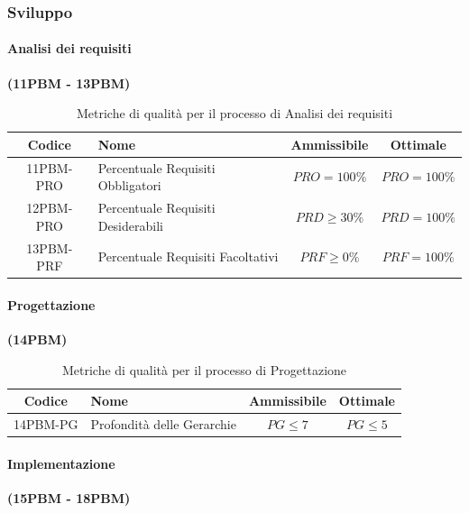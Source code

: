\documentclass{article}
\begin{document}
\subsubsection{Sviluppo} %
\paragraph{Analisi dei requisiti}%
\textbf{(11PBM - 13PBM)}

\begin{table}[H]
    \centering
    \renewcommand{\arraystretch}{1.5} %
    \begin{tabular}{|c|l|c|c|}
        \hline
        \textbf{Codice} & \textbf{Nome} & \textbf{Ammissibile} & \textbf{Ottimale} \\
        \hline
        11PBM-PRO & Percentuale Requisiti Obbligatori & $PRO = 100\%$ & $PRO = 100\%$ \\
        12PBM-PRO & Percentuale Requisiti Desiderabili & $PRD \geq 30\%$ & $PRD = 100\%$ \\
        13PBM-PRF & Percentuale Requisiti Facoltativi & $PRF \geq 0\%$ & $PRF = 100\%$ \\
        \hline
    \end{tabular}
    \label{tab:analisi_requisiti}
    \caption{Metriche di qualità per il processo di Analisi dei requisiti}
    \end{table}


\paragraph{Progettazione}%
\textbf{(14PBM)}

\begin{table}[H]
    \centering
    \renewcommand{\arraystretch}{1.5} %
    \begin{tabular}{|c|l|c|c|}
        \hline
        \textbf{Codice} & \textbf{Nome} & \textbf{Ammissibile} & \textbf{Ottimale} \\
        \hline
        14PBM-PG & Profondità delle Gerarchie & $PG \leq 7$ & $PG \leq 5$ \\
        \hline
    \end{tabular}
    \label{tab:progettazione}
    \caption{Metriche di qualità per il processo di Progettazione}
\end{table}

\paragraph{Implementazione}%
\textbf{(15PBM - 18PBM)}
\end{document}
